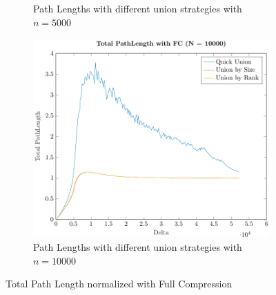 \begin{figure}[ht]
\begin{subfigure}{0.32\textwidth}
        \caption{Path Lengths with different union strategies with $n = 5000$}
    \end{subfigure}%
    \hfill
    \begin{subfigure}{0.32\textwidth}
        \centering
        \includegraphics[width=\textwidth]{../images/plotFCFull10000_PathLength.pdf}
        \caption{Path Lengths with different union strategies with $n = 10000$}
    \end{subfigure}

    \caption{Total Path Length normalized with Full Compression}
    \label{fig:tplFC}
\end{figure}

